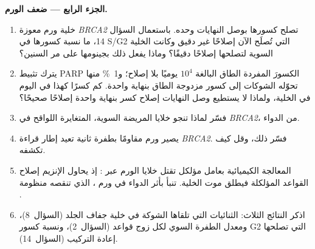 \begin{problem}
\medskip
\noindent\textbf{الجزء الرابع --- ضعف الورم.}
\begin{enumerate}[resume]
  \item خلية ورم معوزة \emph{BRCA2} تصلح كسورها بوصل النهايات وحده.
        باستعمال السؤال 14، ما نسبة كسورها في S/G2 التي تُصلَح الآن
        إصلاحًا غير دقيق وكانت الخلية السوية لتصلحها
        إصلاحًا دقيقًا؟ وماذا يفعل ذلك بجينومها على مر السنين؟
  \item يترك تثبيط PARP الكسورَ المفردة الطاق البالغة $10^{4}$
        يوميًا بلا إصلاح؛ و\qty{1}{\%} منها تحوّله الشوكات إلى كسور
        مزدوجة الطاق بنهاية واحدة. كم كسرًا كهذا في اليوم
        في الخلية، ولماذا لا يستطيع وصل النهايات إصلاح كسر بنهاية
        واحدة إصلاحًا صحيحًا؟
  \item فسّر لماذا تنجو خلايا المريضة السوية، المتغايرة اللواقح
        في \emph{BRCA2}، من الدواء.
  \item يصير ورم مقاومًا بطفرة ثانية تعيد إطار قراءة
        \emph{BRCA2}. فسّر ذلك، وقل كيف
        تكشفه.
  \item المعالجة الكيميائية بعامل مؤلكل تقتل خلايا الورم
        عبر : إذ يحاول الإنزيم إصلاح
        القواعد المؤلكلة فيطلق موت الخلية. تنبأ بأثر
        الدواء في ورم ، الذي تنقصه منظومة .
  \item اذكر النتائج الثلاث: الثنائيات التي تلقاها الشوكة في خلية
        جفاف الجلد (السؤال~8)، ومعدل الطفرة السوي لكل زوج قواعد
        (السؤال~2)، ونسبة كسور G2 التي تصلحها إعادة التركيب
        (السؤال~14).
\end{enumerate}
\end{problem}
